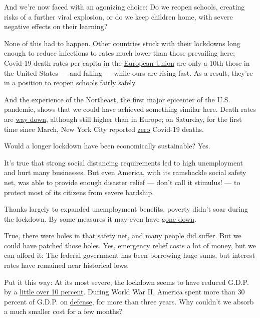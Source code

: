 And we're now faced with an agonizing choice: Do we reopen schools,
creating risks of a further viral explosion, or do we keep children
home, with severe negative effects on their learning?

None of this had to happen. Other countries stuck with their lockdowns
long enough to reduce infections to rates much lower than those
prevailing here; Covid-19 death rates per capita in the
\href{https://twitter.com/paulkrugman/status/1282656106762952705}{European
Union} are only a 10th those in the United States --- and falling ---
while ours are rising fast. As a result, they're in a position to reopen
schools fairly safely.

And the experience of the Northeast, the first major epicenter of the
U.S. pandemic, shows that we could have achieved something similar here.
Death rates are
\href{https://covidtracking.com/data/charts/regional-deaths}{way down},
although still higher than in Europe; on Saturday, for the first time
since March, New York City reported
\href{https://www.amny.com/coronavirus/july-11-was-nycs-first-day-without-a-covid-19-death-in-four-months/}{zero}
Covid-19 deaths.

Would a longer lockdown have been economically sustainable? Yes.

It's true that strong social distancing requirements led to high
unemployment and hurt many businesses. But even America, with its
ramshackle social safety net, was able to provide enough disaster relief
--- don't call it stimulus! --- to protect most of its citizens from
severe hardship.

Thanks largely to expanded unemployment benefits, poverty didn't soar
during the lockdown. By some measures it may even have
\href{https://www.nytimes.com/2020/06/21/us/politics/coronavirus-poverty.html}{gone
down}.

True, there were holes in that safety net, and many people did suffer.
But we could have patched those holes. Yes, emergency relief costs a lot
of money, but we can afford it: The federal government has been
borrowing huge sums, but interest rates have remained near historical
lows.

Put it this way: At its most severe, the lockdown seems to have reduced
G.D.P. by a
\href{https://www.newyorkfed.org/research/policy/weekly-economic-index}{little
over 10 percent}. During World War II, America spent more than 30
percent of G.D.P. on
\href{https://eh.net/encyclopedia/the-american-economy-during-world-war-ii/}{defense},
for more than three years. Why couldn't we absorb a much smaller cost
for a few months?

